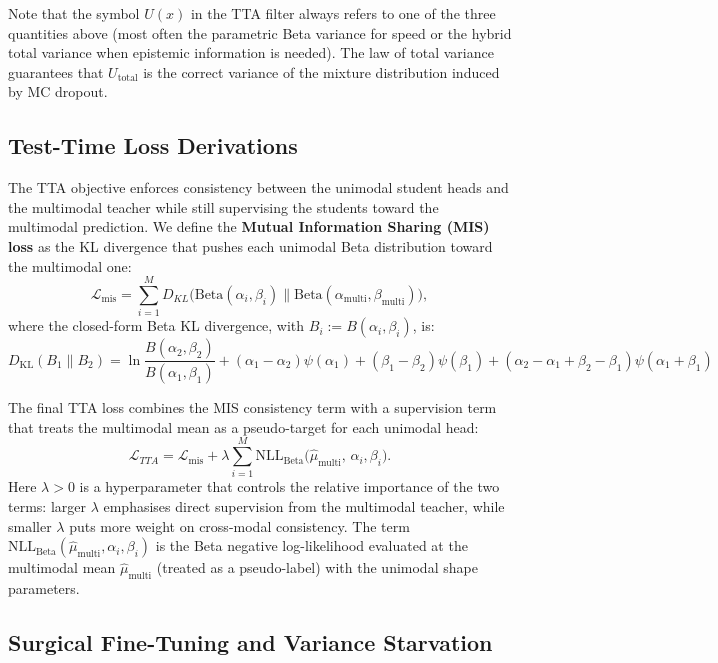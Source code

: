 \documentclass[11pt,a4paper]{article}
\begin{document}
	Note that the symbol $U(x)$ in the TTA filter always refers to one of the three quantities above (most often the parametric Beta variance for speed or the hybrid total variance when epistemic information is needed). The law of total variance guarantees that $U_{\text{total}}$ is the correct variance of the mixture distribution induced by MC dropout.
	
	\subsection{Test-Time Loss Derivations}
	
	The TTA objective enforces consistency between the unimodal student heads and the multimodal teacher while still supervising the students toward the multimodal prediction. We define the \textbf{Mutual Information Sharing (MIS) loss} as the KL divergence that pushes each unimodal Beta distribution toward the multimodal one:
	$$
	\mathcal{L}_{\text{mis}} = \sum_{i=1}^M D_{KL} \bigl( \mathrm{Beta}(\alpha_i, \beta_i) \parallel \mathrm{Beta}(\alpha_{\text{multi}}, \beta_{\text{multi}}) \bigr),
	$$
	where the closed-form Beta KL divergence, with $ B_i := B(\alpha_i,\beta_i) $, is:
	\begin{equation}
		\label{eq:beta_kl}
		D_{\text{KL}}(B_1 \parallel B_2) = \ln \frac{B(\alpha_2,\beta_2)}{B(\alpha_1,\beta_1)} + (\alpha_1 - \alpha_2)\psi(\alpha_1) + (\beta_1 - \beta_2)\psi(\beta_1) + (\alpha_2 - \alpha_1 + \beta_2 - \beta_1)\psi(\alpha_1 + \beta_1)
	\end{equation}
	
	The final TTA loss combines the MIS consistency term with a supervision term that treats the multimodal mean as a pseudo-target for each unimodal head:
	$$
	\mathcal{L}_{TTA} = \mathcal{L}_{\text{mis}} + \lambda \sum_{i=1}^M \text{NLL}_{\text{Beta}}\bigl(\hat{\mu}_{\text{multi}},\, \alpha_i, \beta_i\bigr).
	$$
	Here $\lambda > 0$ is a hyperparameter that controls the relative importance of the two terms: larger $\lambda$ emphasises direct supervision from the multimodal teacher, while smaller $\lambda$ puts more weight on cross-modal consistency. The term $\text{NLL}_{\text{Beta}}(\hat{\mu}_{\text{multi}}, \alpha_i, \beta_i)$ is the Beta negative log-likelihood evaluated at the multimodal mean $\hat{\mu}_{\text{multi}}$ (treated as a pseudo-label) with the unimodal shape parameters.
	
	\subsection{Surgical Fine-Tuning and Variance Starvation}
	
\end{document}
